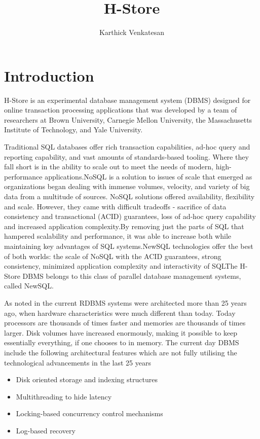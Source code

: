 \documentclass[9pt,twocolumn,twoside]{styles/osajnl}
\title{H-Store}
\author[1,*,+]{Karthick Venkatesan}
\affil[1]{School of Informatics and Computing, Bloomington, IN 47408, U.S.A.}
\affil[*]{Corresponding authors: vkarthickprabu@gmail.com}
\affil[+]{HID - S17-IO-3023}
\begin{document}
\maketitle

\section{Introduction}

H-Store is an experimental database management system (DBMS) designed for online transaction processing applications 
that was developed by a team of researchers  at Brown University, Carnegie Mellon University, the Massachusetts Institute of Technology, and Yale University.

Traditional SQL databases offer rich transaction capabilities, ad-hoc query and reporting capability, and vast amounts of standards-based tooling. Where they fall short is in the ability to scale out to meet the needs of modern, high-performance applications.NoSQL is  a solution to issues of scale that emerged as organizations began dealing with immense volumes, velocity, and variety of big data from a multitude of sources. NoSQL solutions offered availability, flexibility and scale. However, they came with difficult tradeoffs - sacrifice of data consistency and transactional (ACID) guarantees, loss of ad-hoc query capability and increased application complexity.By removing just the parts of SQL that hampered scalability and performance, it was able to increase both while maintaining key advantages of SQL systems.NewSQL technologies offer the best of both worlds: the scale of NoSQL with the ACID guarantees, strong consistency, minimized application complexity and interactivity of SQLThe H-Store DBMS belongs to this class of parallel database management systems, called NewSQL.

As noted in \cite{stonebraker2007} the current RDBMS systems were architected more than 25 years ago, when
hardware characteristics were much different than today.
Today processors are thousands of times faster and memories are
thousands of times larger. Disk volumes have increased
enormously, making it possible to keep essentially everything, if
one chooses to in memory. The current day DBMS 
include the following architectural features which are not fully utilising 
the technological advancements in the last 25 years
\begin{itemize}
\renewcommand{\labelitemi}{\scriptsize$\bullet$} 
\item Disk oriented storage and indexing structures
\item Multithreading to hide latency
\item Locking-based concurrency control mechanisms
\item Log-based recovery
\end{itemize}
\end{document}
